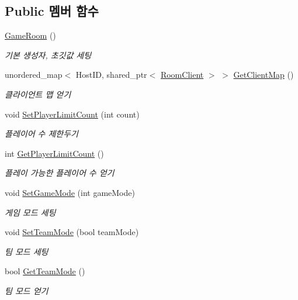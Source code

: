 \subsection*{Public 멤버 함수}
\begin{DoxyCompactItemize}
\item 
\hyperlink{class_game_room_a7b885c42c8215fa1de563f51a35592ed}{Game\+Room} ()
\begin{DoxyCompactList}\small\item\em 기본 생성자, 초깃값 세팅 \end{DoxyCompactList}\item 
unordered\+\_\+map$<$ Host\+ID, shared\+\_\+ptr$<$ \hyperlink{class_room_client}{Room\+Client} $>$ $>$ \hyperlink{class_game_room_ae59443257f14fe5ef17c542981e65f3f}{Get\+Client\+Map} ()
\begin{DoxyCompactList}\small\item\em 클라이언트 맵 얻기 \end{DoxyCompactList}\item 
void \hyperlink{class_game_room_add1aa703d428eaeb558499adb8ab5fb0}{Set\+Player\+Limit\+Count} (int count)
\begin{DoxyCompactList}\small\item\em 플레이어 수 제한두기 \end{DoxyCompactList}\item 
int \hyperlink{class_game_room_a0bc57f748c9381c9741dbec7954643f9}{Get\+Player\+Limit\+Count} ()
\begin{DoxyCompactList}\small\item\em 플레이 가능한 플레이어 수 얻기 \end{DoxyCompactList}\item 
void \hyperlink{class_game_room_a65b49e5004eca5e730ac9cd7c173a5f9}{Set\+Game\+Mode} (int game\+Mode)
\begin{DoxyCompactList}\small\item\em 게임 모드 세팅 \end{DoxyCompactList}\item 
void \hyperlink{class_game_room_a9c5ecd98749f146054d1797084591c28}{Set\+Team\+Mode} (bool team\+Mode)
\begin{DoxyCompactList}\small\item\em 팀 모드 세팅 \end{DoxyCompactList}\item 
bool \hyperlink{class_game_room_aa18f96d11b894fa1c6e0977dc5666b53}{Get\+Team\+Mode} ()
\begin{DoxyCompactList}\small\item\em 팀 모드 얻기 \end{DoxyCompactList}\item 

\end{DoxyCompactItemize}
